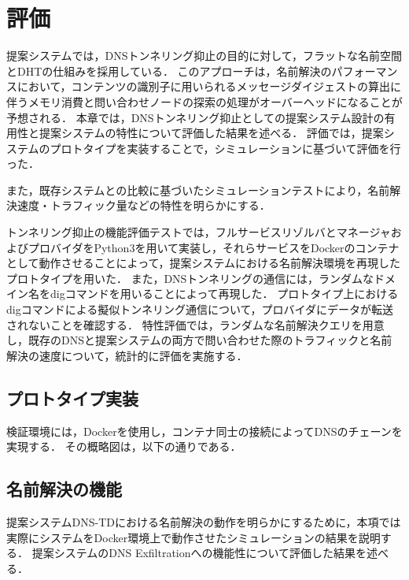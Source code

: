 \section{評価}
\label{sec:evaluation}
提案システムでは，DNSトンネリング抑止の目的に対して，フラットな名前空間とDHTの仕組みを採用している．
このアプローチは，名前解決のパフォーマンスにおいて，コンテンツの識別子に用いられるメッセージダイジェストの算出に伴うメモリ消費と問い合わせノードの探索の処理がオーバーヘッドになることが予想される．
本章では，DNSトンネリング抑止としての提案システム設計の有用性と提案システムの特性について評価した結果を述べる．
評価では，提案システムのプロトタイプを実装することで，シミュレーションに基づいて評価を行った．

また，既存システムとの比較に基づいたシミュレーションテストにより，名前解決速度・トラフィック量などの特性を明らかにする．

トンネリング抑止の機能評価テストでは，フルサービスリゾルバとマネージャおよびプロバイダをPython3を用いて実装し，それらサービスをDockerのコンテナとして動作させることによって，提案システムにおける名前解決環境を再現したプロトタイプを用いた．
また，DNSトンネリングの通信には，ランダムなドメイン名をdigコマンドを用いることによって再現した．
プロトタイプ上におけるdigコマンドによる擬似トンネリング通信について，プロバイダにデータが転送されないことを確認する．
特性評価では，ランダムな名前解決クエリを用意し，既存のDNSと提案システムの両方で問い合わせた際のトラフィックと名前解決の速度について，統計的に評価を実施する．

\subsection{プロトタイプ実装}
検証環境には，Dockerを使用し，コンテナ同士の接続によってDNSのチェーンを実現する．
その概略図は，以下の通りである．

\subsection{名前解決の機能}
\label{sec:eval-tunnel}
提案システムDNS-TDにおける名前解決の動作を明らかにするために，本項では実際にシステムをDocker環境上で動作させたシミュレーションの結果を説明する．
提案システムのDNS Exfiltrationへの機能性について評価した結果を述べる．

